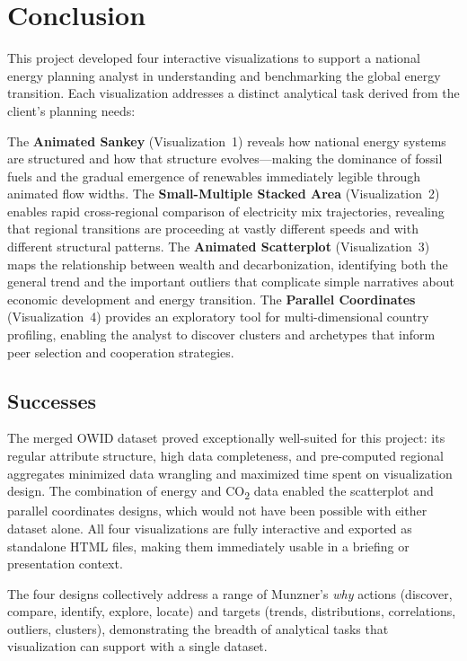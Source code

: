 \documentclass[10pt]{article}
\begin{document}
\section{Conclusion}
\label{sec:conclusion}

This project developed four interactive visualizations to support a national energy planning analyst in understanding and benchmarking the global energy transition. Each visualization addresses a distinct analytical task derived from the client's planning needs:

The \textbf{Animated Sankey} (Visualization~1) reveals how national energy systems are structured and how that structure evolves---making the dominance of fossil fuels and the gradual emergence of renewables immediately legible through animated flow widths. The \textbf{Small-Multiple Stacked Area} (Visualization~2) enables rapid cross-regional comparison of electricity mix trajectories, revealing that regional transitions are proceeding at vastly different speeds and with different structural patterns. The \textbf{Animated Scatterplot} (Visualization~3) maps the relationship between wealth and decarbonization, identifying both the general trend and the important outliers that complicate simple narratives about economic development and energy transition. The \textbf{Parallel Coordinates} (Visualization~4) provides an exploratory tool for multi-dimensional country profiling, enabling the analyst to discover clusters and archetypes that inform peer selection and cooperation strategies.

\subsection{Successes}

The merged OWID dataset proved exceptionally well-suited for this project: its regular attribute structure, high data completeness, and pre-computed regional aggregates minimized data wrangling and maximized time spent on visualization design. The combination of energy and CO\textsubscript{2} data enabled the scatterplot and parallel coordinates designs, which would not have been possible with either dataset alone. All four visualizations are fully interactive and exported as standalone HTML files, making them immediately usable in a briefing or presentation context.

The four designs collectively address a range of Munzner's \emph{why} actions (discover, compare, identify, explore, locate) and targets (trends, distributions, correlations, outliers, clusters), demonstrating the breadth of analytical tasks that visualization can support with a single dataset.
\end{document}
